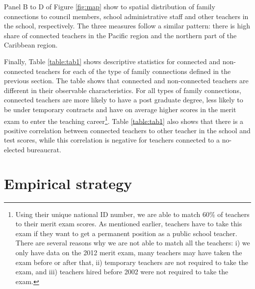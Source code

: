 \documentclass[12pt,runningheads]{article}
\begin{document}
Panel B to D of Figure \ref{fig:map} show to spatial distribution of family connections to council members, school administrative staff and other teachers in the school, respectively. The three measures follow a similar pattern: there is high share of connected teachers in the Pacific region and the northern part of the Caribbean region.  

Finally, Table \ref{table:tab1} shows descriptive statistics for connected and non-connected teachers for each of the type of family connections defined in the previous section. The table shows that connected and non-connected teachers are different in their observable characteristics. For all types of family connections, connected teachers are more likely to have a post graduate degree, less likely to be under temporary contracts and have on average higher scores in the merit exam to enter the teaching career\footnote{Using their unique national ID number, we are able to match 60\% of teachers to their merit exam scores. As mentioned earlier, teachers have to take this exam if they want to get a permanent position as a public school teacher. There are several reasons why we are not able to match all the teachers: i) we only have data on the 2012 merit exam, many teachers may have taken the exam before or after that, ii) temporary teachers are not required to take the exam, and iii) teachers hired before 2002 were not required to take the exam.}. Table \ref{table:tab1} also shows that there is a positive correlation between connected teachers to other teacher in the school and test scores, while this correlation is negative for teachers connected to a no-elected bureaucrat.

\section{Empirical strategy} 
\end{document}
